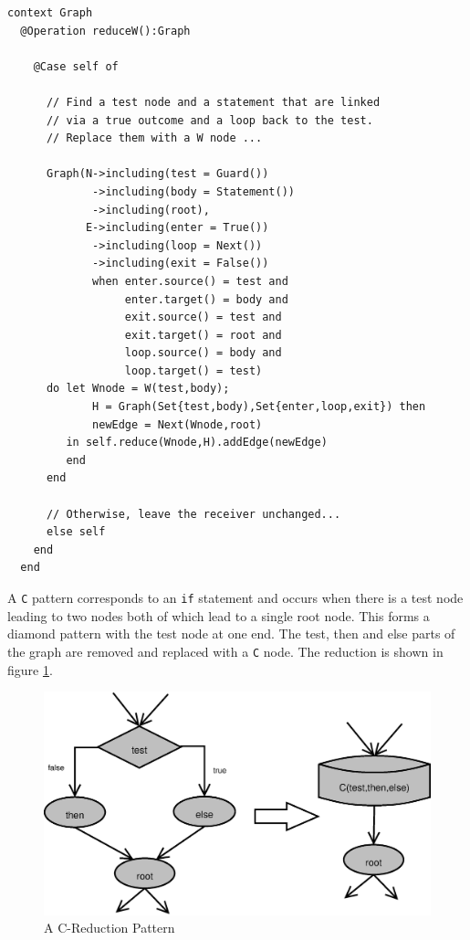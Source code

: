 \documentclass{article}
\begin{document}
\begin{verbatim}
context Graph
  @Operation reduceW():Graph
  
    @Case self of
    
      // Find a test node and a statement that are linked
      // via a true outcome and a loop back to the test.
      // Replace them with a W node ...
      
      Graph(N->including(test = Guard())
             ->including(body = Statement())
             ->including(root),
            E->including(enter = True())
             ->including(loop = Next())
             ->including(exit = False())
             when enter.source() = test and
                  enter.target() = body and
                  exit.source() = test and
                  exit.target() = root and
                  loop.source() = body and
                  loop.target() = test)
      do let Wnode = W(test,body);
             H = Graph(Set{test,body),Set{enter,loop,exit}) then
             newEdge = Next(Wnode,root)
         in self.reduce(Wnode,H).addEdge(newEdge)
         end
      end
      
      // Otherwise, leave the receiver unchanged...
      else self
    end
  end
\end{verbatim}
A {\tt C} pattern corresponds to an {\tt if} statement and occurs when there
is a test node leading to two nodes both of which lead to a single root node.
This forms a diamond pattern with the test node at one end. The test, then
and else parts of the graph are removed and replaced with a {\tt C} node.
The reduction is shown in figure \ref{CReduction}.

\begin{figure}
\begin{center}
\includegraphics[scale=0.4]{C}
\end{center}
\caption{A C-Reduction Pattern}
\label{CReduction}
\end{figure}
\end{document}
